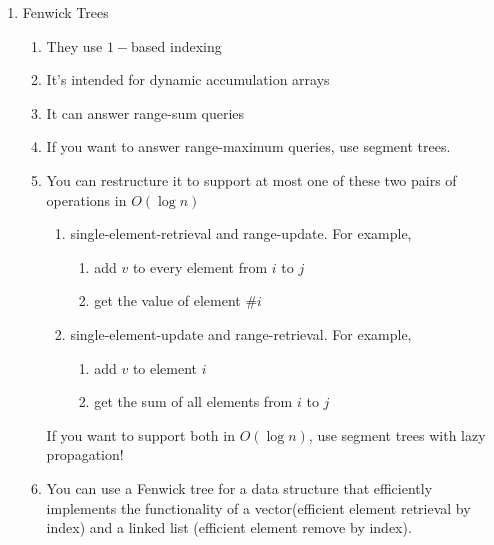 \documentclass[12pt]{book}
\begin{document}
\begin{enumerate}
\item Fenwick Trees
\begin{enumerate}
\item They use $1-$based indexing
\item It's intended for dynamic accumulation arrays
\item It can answer range-sum queries
\item If you want to answer range-maximum queries, use segment trees.
\item You can restructure it to support at most one of these two pairs of operations in $O(\log n)$
\begin{enumerate}
\item single-element-retrieval and range-update. For example,
\begin{enumerate}
\item add $v$ to every element from $i$ to $j$
\item get the value of element $\#i$
\end{enumerate}
\item single-element-update and range-retrieval. For example,
\begin{enumerate}
\item add $v$ to element $i$
\item get the sum of all elements from $i$ to $j$
\end{enumerate}
\end{enumerate}
If you want to support both in $O(\log n)$, use segment trees with lazy propagation!
\item You can use a Fenwick tree for a data structure that efficiently implements the functionality of a vector(efficient element retrieval by index) and a linked list (efficient element remove by index).
\end{enumerate}


\end{enumerate}
\end{document}
